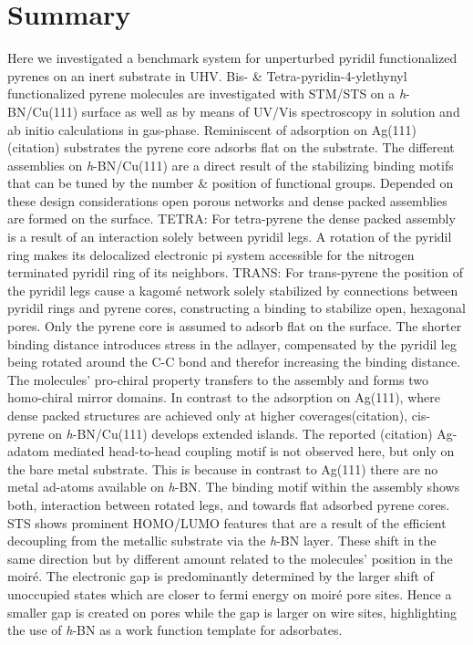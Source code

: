 \section{Summary}
Here we investigated a benchmark system for unperturbed pyridil functionalized pyrenes on an inert substrate in UHV. Bis- \& Tetra-pyridin-4-ylethynyl functionalized pyrene molecules are investigated with STM/STS on a \textit{h}-BN/Cu(111) surface as well as by means of UV/Vis spectroscopy in solution and ab initio calculations in gas-phase.
Reminiscent of adsorption on Ag(111)(citation) substrates the pyrene core adsorbs flat on the substrate. The different assemblies on \textit{h}-BN/Cu(111) are a direct result of the stabilizing binding motifs that can be tuned by the number \& position of functional groups. Depended on these design considerations open porous networks and dense packed assemblies are formed on the surface.
TETRA: For tetra-pyrene the dense packed assembly is a result of an interaction solely between pyridil legs. A rotation of the pyridil ring makes its delocalized electronic pi system accessible for the nitrogen terminated pyridil ring of  its neighbors.
TRANS: For trans-pyrene the position of the pyridil legs cause a kagom\'e network solely stabilized by connections between pyridil rings and pyrene cores, constructing a binding to stabilize open, hexagonal pores. Only the pyrene core is assumed to adsorb flat on the surface. The shorter binding distance introduces stress in the adlayer, compensated by the pyridil leg being rotated around the C-C bond and therefor increasing the binding distance. The molecules’ pro-chiral property transfers to the assembly and forms two homo-chiral mirror domains. 
In contrast to the adsorption on Ag(111), where dense packed structures are achieved only at higher coverages(citation), cis-pyrene on \textit{h}-BN/Cu(111) develops extended islands. The reported (citation) Ag-adatom mediated head-to-head coupling motif is not observed here, but only on the bare metal substrate. This is because in contrast to Ag(111) there are no metal ad-atoms available on \textit{h}-BN. The binding motif within the assembly shows both, interaction between rotated legs, and towards flat adsorbed pyrene cores.
STS shows prominent HOMO/LUMO features that are a result of the efficient decoupling from the metallic substrate via the \textit{h}-BN layer. These shift in the same direction but by different amount related to the molecules' position in the moir\'e. The electronic gap is predominantly determined by the larger shift of unoccupied states which are closer to fermi energy on moir\'e pore sites. Hence a smaller gap is created on pores while the gap is larger on wire sites, highlighting the use of \textit{h}-BN as a work function template for adsorbates.
